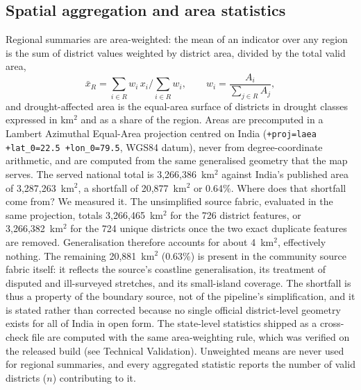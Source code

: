 \documentclass[10pt,a4paper]{article}
\begin{document}
\subsection*{Spatial aggregation and area statistics}
Regional summaries are area-weighted: the mean of an indicator over any region is the sum of district values weighted by district area, divided by the total valid area,
\[
\bar{x}_{R}=\sum_{i\in R} w_i\,x_i \Big/ \sum_{i\in R} w_i ,\qquad w_i=\frac{A_i}{\sum_{j\in R}A_j},
\]
and drought-affected area is the equal-area surface of districts in drought classes expressed in km$^2$ and as a share of the region. Areas are precomputed in a Lambert Azimuthal Equal-Area projection centred on India (\texttt{+proj=laea +lat\_0=22.5 +lon\_0=79.5}, WGS84 datum), never from degree-coordinate arithmetic, and are computed from the same generalised geometry that the map serves. The served national total is 3{,}266{,}386~km$^2$ against India's published area of 3{,}287{,}263~km$^{2}$, a shortfall of 20{,}877~km$^2$ or 0.64\%. Where does that shortfall come from? We measured it. The unsimplified source fabric, evaluated in the same projection, totals 3{,}266{,}465~km$^2$ for the 726 district features, or 3{,}266{,}382~km$^2$ for the 724 unique districts once the two exact duplicate features are removed. Generalisation therefore accounts for about 4~km$^2$, effectively nothing. The remaining 20{,}881~km$^2$ (0.63\%) is present in the community source fabric itself: it reflects the source's coastline generalisation, its treatment of disputed and ill-surveyed stretches, and its small-island coverage. The shortfall is thus a property of the boundary source, not of the pipeline's simplification, and it is stated rather than corrected because no single official district-level geometry exists for all of India in open form. The state-level statistics shipped as a cross-check file are computed with the same area-weighting rule, which was verified on the released build (see Technical Validation). Unweighted means are never used for regional summaries, and every aggregated statistic reports the number of valid districts ($n$) contributing to it.
\end{document}

